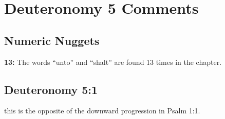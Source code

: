 \section{Deuteronomy 5 Comments}

\subsection{Numeric Nuggets}
\textbf{13: } The words ``unto'' and ``shalt'' are found 13 times in the chapter.

\subsection{Deuteronomy 5:1}
this is the opposite of the downward progression in Psalm 1:1.